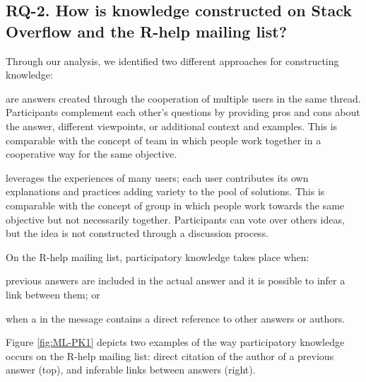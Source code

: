 \subsection{RQ-2. How is knowledge constructed on Stack Overflow and the R-help mailing list?}
\label{sec:rq2}

    Through our analysis, we identified two different approaches for constructing knowledge:

\begin{description}[itemsep=2pt, topsep=0pt, leftmargin=1em, parsep=0pt]
\item[Participatory knowledge construction] are answers created through the cooperation of multiple users in the same thread.
        Participants complement each other's questions by providing pros and cons about the answer, different viewpoints, or additional context and examples.
        This is comparable with the concept of team in which people work together in a cooperative way for the same objective.

\item[Crowd knowledge construction] leverages the experiences of many users; each user contributes its own explanations and practices adding variety to the pool of solutions.
        This is comparable with the concept of group in which people work towards the same objective but not necessarily together.
        Participants can vote over others ideas, but the idea is not constructed through a discussion process.
\end{description}

    On the R-help mailing list, participatory knowledge takes place when:
    \begin{enumerate*}[label=(\arabic*)]
    \item previous answers are included in the actual answer and it is possible to infer a link between them; or
    \item when a in the message contains a direct reference to other answers or authors.
    \end{enumerate*}
    Figure \ref{fig:ML-PK1} depicts two examples of the way participatory knowledge occurs on the R-help mailing list:
    direct citation of the author of a previous answer (top), and inferable links between answers (right).


